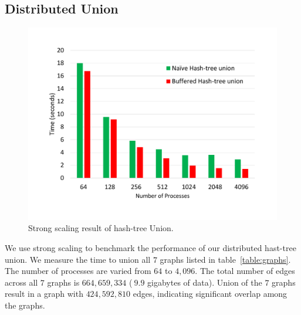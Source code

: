 
\subsection{Distributed Union}
\label{sec:union}

\begin{figure}[h]
	\includegraphics[width=\columnwidth]{results/hash_tree_union.pdf}
	\caption{Strong scaling result of hash-tree Union.}
	\label{fig:dist_union}
\end{figure}


We use strong scaling to benchmark the performance of our distributed hast-tree union. We measure the time to union all $7$ graphs listed in table~\ref{table:graphs}. The number of processes are varied from $64$ to $4,096$. The total number of edges across all $7$ graphs is $664,659,334$ ($~9.9$ gigabytes of data). Union of the $7$ graphs result in a graph with $424,592,810$ edges, indicating significant overlap among the graphs.

